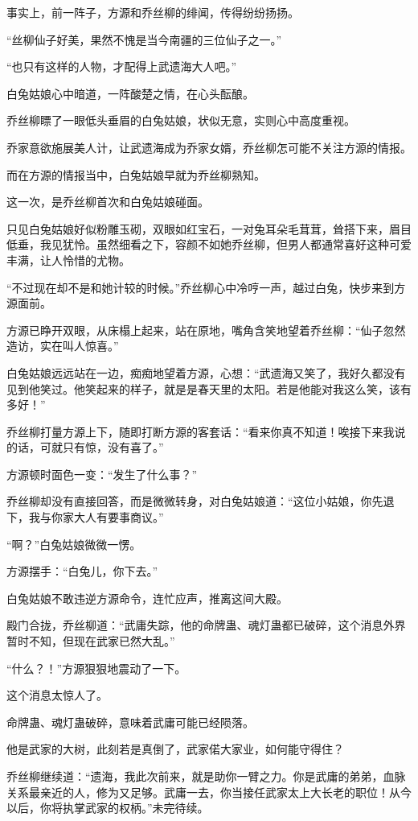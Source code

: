 \begin{this_body}
事实上，前一阵子，方源和乔丝柳的绯闻，传得纷纷扬扬。

“丝柳仙子好美，果然不愧是当今南疆的三位仙子之一。”

“也只有这样的人物，才配得上武遗海大人吧。”

白兔姑娘心中暗道，一阵酸楚之情，在心头酝酿。

乔丝柳瞟了一眼低头垂眉的白兔姑娘，状似无意，实则心中高度重视。

乔家意欲施展美人计，让武遗海成为乔家女婿，乔丝柳怎可能不关注方源的情报。

而在方源的情报当中，白兔姑娘早就为乔丝柳熟知。

这一次，是乔丝柳首次和白兔姑娘碰面。

只见白兔姑娘好似粉雕玉砌，双眼如红宝石，一对兔耳朵毛茸茸，耸搭下来，眉目低垂，我见犹怜。虽然细看之下，容颜不如她乔丝柳，但男人都通常喜好这种可爱丰满，让人怜惜的尤物。

“不过现在却不是和她计较的时候。”乔丝柳心中冷哼一声，越过白兔，快步来到方源面前。

方源已睁开双眼，从床榻上起来，站在原地，嘴角含笑地望着乔丝柳：“仙子忽然造访，实在叫人惊喜。”

白兔姑娘远远站在一边，痴痴地望着方源，心想：“武遗海又笑了，我好久都没有见到他笑过。他笑起来的样子，就是是春天里的太阳。若是他能对我这么笑，该有多好！”

乔丝柳打量方源上下，随即打断方源的客套话：“看来你真不知道！唉接下来我说的话，可就只有惊，没有喜了。”

方源顿时面色一变：“发生了什么事？”

乔丝柳却没有直接回答，而是微微转身，对白兔姑娘道：“这位小姑娘，你先退下，我与你家大人有要事商议。”

“啊？”白兔姑娘微微一愣。

方源摆手：“白兔儿，你下去。”

白兔姑娘不敢违逆方源命令，连忙应声，推离这间大殿。

殿门合拢，乔丝柳道：“武庸失踪，他的命牌蛊、魂灯蛊都已破碎，这个消息外界暂时不知，但现在武家已然大乱。”

“什么？！”方源狠狠地震动了一下。

这个消息太惊人了。

命牌蛊、魂灯蛊破碎，意味着武庸可能已经陨落。

他是武家的大树，此刻若是真倒了，武家偌大家业，如何能守得住？

乔丝柳继续道：“遗海，我此次前来，就是助你一臂之力。你是武庸的弟弟，血脉关系最亲近的人，修为又足够。武庸一去，你当接任武家太上大长老的职位！从今以后，你将执掌武家的权柄。”未完待续。

\end{this_body}

